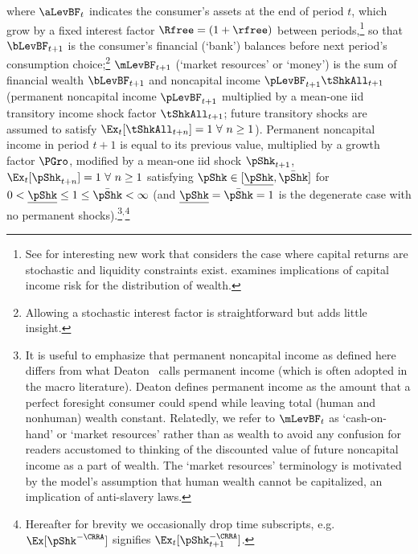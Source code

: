 \documentclass[BufferStockTheory]{subfiles}
\begin{document}
 where $\aLevBF_{t}$ indicates the consumer's assets at the end of period $t$, which grow by a fixed interest factor $\Rfree =(1+\rfree)$ between periods,\footnote{See \cite{mstCapIncFluct} for interesting new work that considers the case where capital returns are stochastic and liquidity constraints exist.  \cite{benhabibWealth} examines implications of capital income risk for the distribution of wealth.}  so that $\bLevBF_{t+1}$ is the consumer's financial (`bank') balances before next period's consumption choice;\footnote{Allowing a stochastic interest factor is straightforward but adds little insight.%
} $\mLevBF_{t+1}$ (`market resources' or `money') is the sum of financial wealth $\bLevBF_{t+1}$ and noncapital income $\pLevBF_{t+1}\tShkAll_{t+1}$ (permanent noncapital income $\pLevBF_{t+1}$ multiplied by a mean-one iid transitory income shock factor $\tShkAll_{t+1}$; future transitory shocks are assumed to satisfy $\Ex_{t}[{\tShkAll}_{t+n}]=1~\forall~n\geq 1$). Permanent noncapital income in period $t+1$ is equal to its previous value, multiplied by a growth factor $\PGro$, modified by a mean-one iid shock $\pShk_{t+1}$, $\Ex_{t}[{\pShk}_{t+n}]=1~\forall~n \geq 1$ satisfying $\pShk \in [\ushort{\pShk},\bar{\pShk}]$ for $0 < \ushort{\pShk} \leq 1 \leq \bar{\pShk} < \infty$ (and $\ushort{\pShk}=\bar{\pShk}=1$ is the degenerate case with no permanent shocks).\footnote{It is useful to emphasize that permanent noncapital income as defined here differs from what Deaton~\citeyearpar{deatonUnderstandingC} calls permanent income (which is often adopted in the macro literature).  Deaton defines permanent income as the amount that a perfect foresight consumer could spend while leaving total (human and nonhuman) wealth constant.  Relatedly, we refer to $\mLevBF_{t}$ as `cash-on-hand' or `market resources' rather than as wealth to avoid any confusion for readers accustomed to thinking of the discounted value of future noncapital income as a part of wealth.  The `market resources' terminology is motivated by the model's assumption that human wealth cannot be capitalized, an implication of anti-slavery laws.}$^{,}$\footnote{Hereafter for brevity we occasionally drop time subscripts, e.g.\ $\Ex[\pShk^{-\CRRA}]$ signifies $\Ex_{t}[\pShk_{t+1}^{-\CRRA}]$.}
\end{document}
